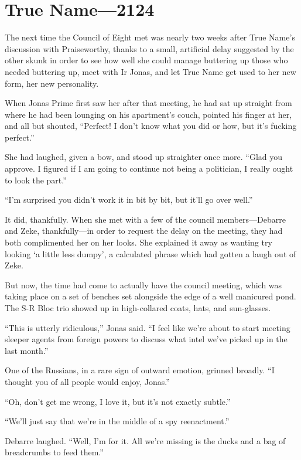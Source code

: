 \hypertarget{true-name-2124}{%
\chapter{True Name---2124}\label{true-name-2124}}

The next time the Council of Eight met was nearly two weeks after True Name's discussion with Praiseworthy, thanks to a small, artificial delay suggested by the other skunk in order to see how well she could manage buttering up those who needed buttering up, meet with Ir Jonas, and let True Name get used to her new form, her new personality.

When Jonas Prime first saw her after that meeting, he had sat up straight from where he had been lounging on his apartment's couch, pointed his finger at her, and all but shouted, ``Perfect! I don't know what you did or how, but it's fucking perfect.''

She had laughed, given a bow, and stood up straighter once more. ``Glad you approve. I figured if I am going to continue not being a politician, I really ought to look the part.''

``I'm surprised you didn't work it in bit by bit, but it'll go over well.''

It did, thankfully. When she met with a few of the council members---Debarre and Zeke, thankfully---in order to request the delay on the meeting, they had both complimented her on her looks. She explained it away as wanting try looking `a little less dumpy', a calculated phrase which had gotten a laugh out of Zeke.

But now, the time had come to actually have the council meeting, which was taking place on a set of benches set alongside the edge of a well manicured pond. The S-R Bloc trio showed up in high-collared coats, hats, and sun-glasses.

``This is utterly ridiculous,'' Jonas said. ``I feel like we're about to start meeting sleeper agents from foreign powers to discuss what intel we've picked up in the last month.''

One of the Russians, in a rare sign of outward emotion, grinned broadly. ``I thought you of all people would enjoy, Jonas.''

``Oh, don't get me wrong, I love it, but it's not exactly subtle.''

``We'll just say that we're in the middle of a spy reenactment.''

Debarre laughed. ``Well, I'm for it. All we're missing is the ducks and a bag of breadcrumbs to feed them.''

